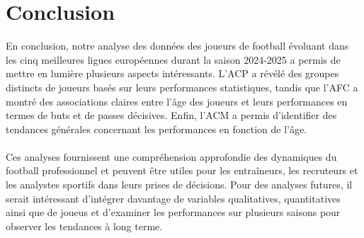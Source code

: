 \documentclass[12pt]{scrartcl}
\begin{document}

    \section{Conclusion}

        En conclusion, notre analyse des données des joueurs de football évoluant dans les cinq meilleures ligues européennes durant la saison 2024-2025 a permis de mettre en lumière plusieurs aspects intéressants. L'ACP a révélé des groupes distincts de joueurs basés sur leurs performances statistiques, tandis que l'AFC a montré des associations claires entre l'âge des joueurs et leurs performances en termes de buts et de passes décisives. Enfin, l'ACM a permis d'identifier des tendances générales concernant les performances en fonction de l'âge.\\\\
        Ces analyses fournissent une compréhension approfondie des dynamiques du football professionnel et peuvent être utiles pour les entraîneurs, les recruteurs et les analystes sportifs dans leurs prises de décisions. Pour des analyses futures, il serait intéressant d'intégrer davantage de variables qualitatives, quantitatives ainsi que de joueus et d'examiner les performances sur plusieurs saisons pour observer les tendances à long terme.\\
\end{document}

